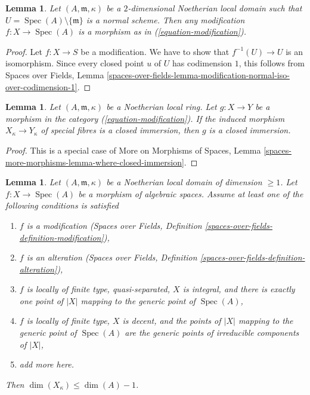 \documentclass{stacks-project}
\theoremstyle{plain}
\newtheorem{lemma}[subsection]{Lemma}
\theoremstyle{definition}
\theoremstyle{remark}
\numberwithin{equation}{subsection}
\def\Spec{\mathop{\mathrm{Spec}}}
\begin{document}
\begin{lemma}
\label{lemma-modification}
Let $(A, \mathfrak m, \kappa)$ be a $2$-dimensional Noetherian
local domain such that $U = \Spec(A) \setminus \{\mathfrak m\}$
is a normal scheme. Then any modification $f : X \to \Spec(A)$
is a morphism as in (\ref{equation-modification}).
\end{lemma}

\begin{proof}
Let $f : X \to S$ be a modification. We have to show that
$f^{-1}(U) \to U$ is an isomorphism. Since every closed point $u$ of $U$
has codimension $1$, this follows from
Spaces over Fields, Lemma
\ref{spaces-over-fields-lemma-modification-normal-iso-over-codimension-1}.
\end{proof}

\begin{lemma}
\label{lemma-closed-immersion-on-fibre}
Let $(A, \mathfrak m, \kappa)$ be a Noetherian local ring.
Let $g : X \to Y$ be a morphism in the category (\ref{equation-modification}).
If the induced morphism $X_\kappa \to Y_\kappa$ of special fibres is
a closed immersion, then $g$ is a closed immersion.
\end{lemma}

\begin{proof}
This is a special case of
More on Morphisms of Spaces, Lemma
\ref{spaces-more-morphisms-lemma-where-closed-immersion}.
\end{proof}

\begin{lemma}
\label{lemma-dimension-special-fibre}
Let $(A, \mathfrak m, \kappa)$ be a Noetherian local domain
of dimension $\geq 1$.
Let $f : X \to \Spec(A)$ be a morphism of algebraic spaces.
Assume at least one of the following conditions is satisfied
\begin{enumerate}
\item $f$ is a modification (Spaces over Fields, Definition
\ref{spaces-over-fields-definition-modification}),
\item $f$ is an alteration (Spaces over Fields, Definition
\ref{spaces-over-fields-definition-alteration}),
\item $f$ is locally of finite type, quasi-separated, $X$ is integral,
and there is exactly one point of $|X|$ mapping to the generic point
of $\Spec(A)$,
\item $f$ is locally of finite type, $X$ is decent, and the points
of $|X|$ mapping to the generic point of $\Spec(A)$ are
the generic points of irreducible components of $|X|$,
\item add more here.
\end{enumerate}
Then $\dim(X_\kappa) \leq \dim(A) - 1$.
\end{lemma}
\end{document}
